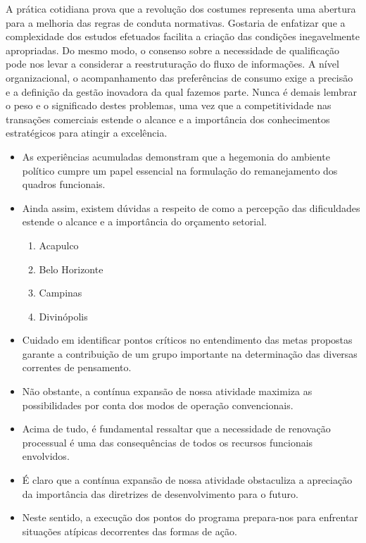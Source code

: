 \documentclass[fleqn]{profmat-cefet}
\begin{document}
A prática cotidiana prova que a revolução dos costumes representa uma abertura
para a melhoria das regras de conduta normativas. Gostaria de enfatizar que a
complexidade dos estudos efetuados facilita a criação das condições
inegavelmente apropriadas. Do mesmo modo, o consenso sobre a necessidade de
qualificação pode nos levar a considerar a reestruturação do fluxo de
informações. A nível organizacional, o acompanhamento das preferências de
consumo exige a precisão e a definição da gestão inovadora da qual fazemos
parte. Nunca é demais lembrar o peso e o significado destes problemas, uma vez
que a competitividade nas transações comerciais estende o alcance e a
importância dos conhecimentos estratégicos para atingir a excelência. 

\begin{itemize}
    
    \item As experiências acumuladas demonstram que a hegemonia do ambiente político
    cumpre um papel essencial na formulação do remanejamento dos quadros funcionais.
    
    \item Ainda assim, existem dúvidas a respeito de como a percepção das
    dificuldades estende o alcance e a importância do orçamento setorial.
    \begin{enumerate}
        \item Acapulco
        \item Belo Horizonte
        \item Campinas
        \item Divinópolis
    \end{enumerate}
    
    \item Cuidado em identificar pontos críticos no entendimento das metas
    propostas garante a contribuição de um grupo importante na determinação das
    diversas correntes de pensamento.
    
    \item Não obstante, a contínua expansão de nossa atividade maximiza as
    possibilidades por conta dos modos de operação convencionais.
    
    \item Acima de tudo, é fundamental ressaltar que a necessidade de renovação
    processual é uma das consequências de todos os recursos funcionais envolvidos.
    
    \item É claro que a contínua expansão de nossa atividade obstaculiza a apreciação
    da importância das diretrizes de desenvolvimento para o futuro.
    
    \item Neste sentido, a execução dos pontos do programa prepara-nos para enfrentar
    situações atípicas decorrentes das formas de ação. 
    
\end{itemize}
\end{document}
